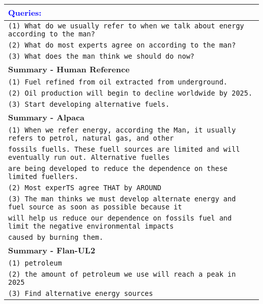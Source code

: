 \documentclass[11pt]{article}
\begin{document}
\begin{table*}[t]
\begin{adjustbox}{width=1.00\textwidth,center}
\begin{tabular}{ | l | }
        

        \hline
        \textbf{\textcolor{blue}{Queries:}} \\ \hline
        \texttt{(1) What do we usually refer to when we talk about energy according to the man?} \\
        \texttt{(2) What do most experts agree on according to the man?} \\
        \texttt{(3) What does the man think we should do now?} \\
        
        \hline \hline
        
        \textbf{Summary - Human Reference} \\ \hline
        \texttt{(1) Fuel refined from oil extracted from underground.} \\
        \texttt{(2) Oil production will begin to decline worldwide by 2025.} \\ 
        \texttt{(3) Start developing alternative fuels.} \\\hline \hline
    
        
        \textbf{Summary - Alpaca} \\ \hline
        \texttt{(1) When we refer energy, according the Man, it usually refers to petrol, natural gas, and other } \\
        \quad\quad \texttt{fossils fuells. These fuell sources are limited and will eventually run out. Alternative fuelles} \\
        \quad\quad \texttt{are being developed to reduce the dependence on these limited fuellers.} \\ 
        \texttt{(2) Most experTS agree THAT by AROUND } \\ 
        \texttt{(3) The man thinks we must develop alternate energy and fuel source as soon as possible because it } \\
        \quad\quad \texttt{will help us reduce our dependence on fossils fuel and limit the negative environmental impacts} \\
        \quad\quad \texttt{caused by burning them.} \\ \hline \hline
        
        \textbf{Summary - Flan-UL2} \\ \hline
        \texttt{(1) petroleum } \\ 
        \texttt{(2) the amount of petroleum we use will reach a peak in 2025 } \\ 
        \texttt{(3) Find alternative energy sources } \\ \hline \hline
        

\end{tabular}
\end{adjustbox}
\end{table*}
\end{document}
